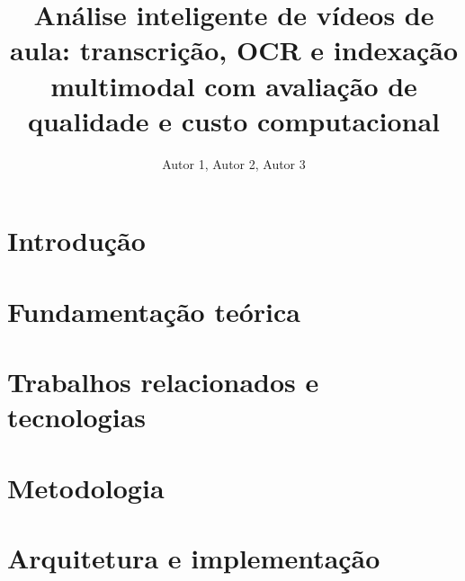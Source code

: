 \documentclass[12pt]{article}
\title{Análise inteligente de vídeos de aula: transcrição, OCR e indexação multimodal
com avaliação de qualidade e custo computacional}
\author{Autor 1\inst{1}, Autor 2\inst{1}, Autor 3\inst{1}}
\begin{document}
\maketitle

\begin{abstract}
\end{abstract}

\begin{resumo}
\end{resumo}

\section{Introdução}

\section{Fundamentação teórica}

\section{Trabalhos relacionados e tecnologias}

\section{Metodologia}

\section{Arquitetura e implementação}
\end{document}
